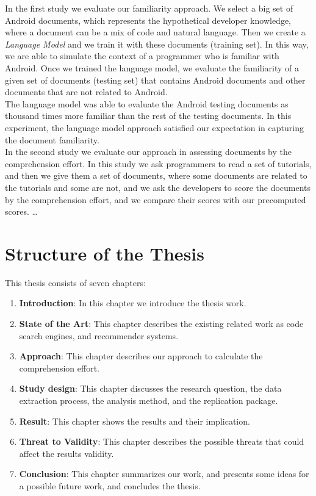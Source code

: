 \documentclass[12pt,mscthesis]{usiinfthesis}
\begin{document}
	 In the first study we evaluate our familiarity approach. We select a big set of Android documents, which represents the hypothetical developer knowledge, where a document can be a mix of code and natural language. Then we create a \emph{ Language Model} \cite{Hindle:2012:NS:2337223.2337322} and we train it with these documents (training set). In this way, we are able to simulate the context of a programmer who is familiar with Android. Once we trained the language model, we evaluate the familiarity of a given set of documents (testing set) that contains Android documents and other documents that are not related to Android.\\ 
	 The language model was able to evaluate the Android testing documents as thousand times more familiar than the rest of the testing documents.
	 In this experiment, the language model approach satisfied our expectation in capturing the document familiarity.\\

	 In the second study we evaluate our approach in assessing documents by the comprehension effort. In this study we ask programmers to read a set of tutorials, and then we give them a set of documents, where some documents are related to the tutorials and some are not, and we ask the developers to score the documents by the comprehension effort, and we compare their scores with our precomputed scores.
	 \dots 


	\section{Structure of the Thesis}
	This thesis consists of seven chapters: 
	\begin{enumerate}
	
		\item \textbf{Introduction}: In this chapter we introduce the thesis work.
		\item \textbf{State of the Art}: This chapter describes the existing related work as code search engines, and recommender systems.
		\item \textbf{Approach}: This chapter describes our approach to calculate the comprehension effort.
		\item \textbf{Study design}: This chapter discusses the research question, the data extraction process, the analysis method, and the replication package.
		\item \textbf{Result}: This chapter shows the results and their implication.
		\item \textbf{Threat to Validity}: This chapter describes the possible threats that could affect the results validity.
		\item \textbf{Conclusion}: This chapter summarizes our work, and presents some ideas for a possible future work, and concludes the thesis.
	\end{enumerate}
\end{document}
